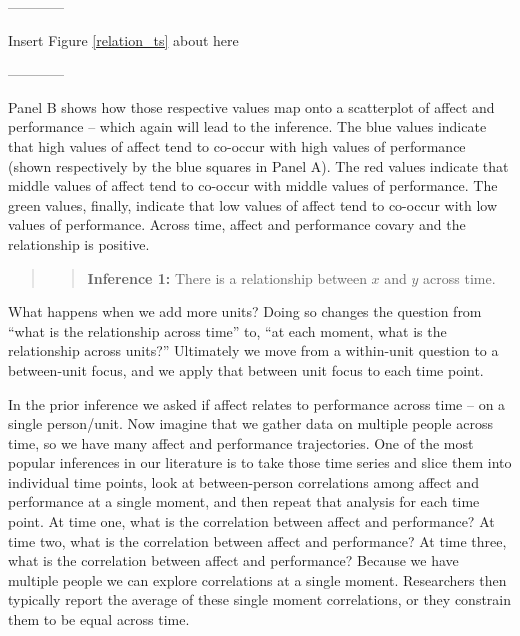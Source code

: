 \documentclass[english,,man]{apa6}
\theoremstyle{definition}
\theoremstyle{definition}
\theoremstyle{definition}
\theoremstyle{remark}
\begin{document}
\begin{center}

------------

Insert Figure \ref{relation_ts} about here

------------

\end{center}

Panel B shows how those respective values map onto a scatterplot of
affect and performance -- which again will lead to the inference. The
blue values indicate that high values of affect tend to co-occur with
high values of performance (shown respectively by the blue squares in
Panel A). The red values indicate that middle values of affect tend to
co-occur with middle values of performance. The green values, finally,
indicate that low values of affect tend to co-occur with low values of
performance. Across time, affect and performance covary and the
relationship is positive.

\begin{quote}
\begin{quote}
\textbf{Inference 1:} There is a relationship between \(x\) and \(y\)
across time.
\end{quote}
\end{quote}

What happens when we add more units? Doing so changes the question from
\enquote{what is the relationship across time} to, \enquote{at each
moment, what is the relationship across units?} Ultimately we move from
a within-unit question to a between-unit focus, and we apply that
between unit focus to each time point.

In the prior inference we asked if affect relates to performance across
time -- on a single person/unit. Now imagine that we gather data on
multiple people across time, so we have many affect and performance
trajectories. One of the most popular inferences in our literature is to
take those time series and slice them into individual time points, look
at between-person correlations among affect and performance at a single
moment, and then repeat that analysis for each time point. At time one,
what is the correlation between affect and performance? At time two,
what is the correlation between affect and performance? At time three,
what is the correlation between affect and performance? Because we have
multiple people we can explore correlations at a single moment.
Researchers then typically report the average of these single moment
correlations, or they constrain them to be equal across time.
\end{document}
